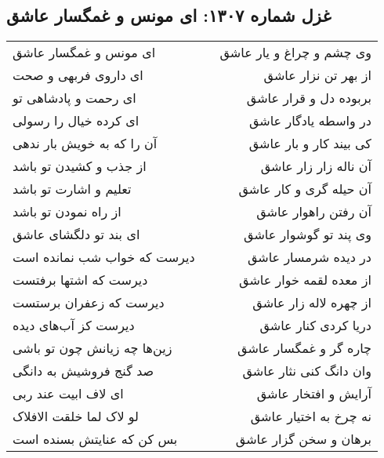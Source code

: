 \begin{center}
\section*{غزل شماره ۱۳۰۷: ای مونس و غمگسار عاشق}
\label{sec:1307}
\begin{longtable}{l p{0.5cm} r}
ای مونس و غمگسار عاشق
&&
وی چشم و چراغ و یار عاشق
\\
ای داروی فربهی و صحت
&&
از بهر تن نزار عاشق
\\
ای رحمت و پادشاهی تو
&&
بربوده دل و قرار عاشق
\\
ای کرده خیال را رسولی
&&
در واسطه یادگار عاشق
\\
آن را که به خویش بار ندهی
&&
کی بیند کار و بار عاشق
\\
از جذب و کشیدن تو باشد
&&
آن ناله زار زار عاشق
\\
تعلیم و اشارت تو باشد
&&
آن حیله گری و کار عاشق
\\
از راه نمودن تو باشد
&&
آن رفتن راهوار عاشق
\\
ای بند تو دلگشای عاشق
&&
وی پند تو گوشوار عاشق
\\
دیرست که خواب شب نمانده است
&&
در دیده شرمسار عاشق
\\
دیرست که اشتها برفتست
&&
از معده لقمه خوار عاشق
\\
دیرست که زعفران برستست
&&
از چهره لاله زار عاشق
\\
دیرست کز آب‌های دیده
&&
دریا کردی کنار عاشق
\\
زین‌ها چه زیانش چون تو باشی
&&
چاره گر و غمگسار عاشق
\\
صد گنج فروشیش به دانگی
&&
وان دانگ کنی نثار عاشق
\\
ای لاف ابیت عند ربی
&&
آرایش و افتخار عاشق
\\
لو لاک لما خلقت الافلاک
&&
نه چرخ به اختیار عاشق
\\
بس کن که عنایتش بسنده است
&&
برهان و سخن گزار عاشق
\\
\end{longtable}
\end{center}
